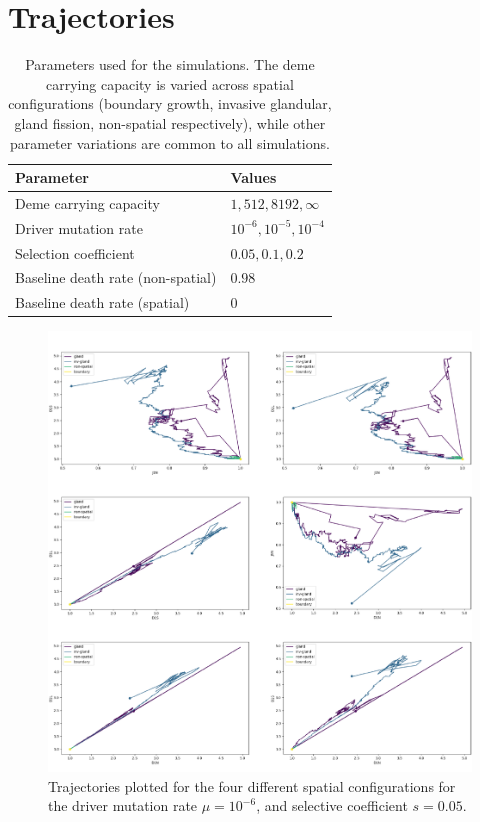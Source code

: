 \chapter{Trajectories}\label{app:trajs}

\begin{table}[h]
\centering
\begin{tabularx}{0.75\textwidth}{|X|X|}
\hline
Parameter & Values \\
\hline
    Deme carrying capacity & $1, 512, 8192, \infty$ \\
    Driver mutation rate & $10^{-6}, 10^{-5}, 10^{-4}$ \\
    Selection coefficient & $0.05, 0.1, 0.2$ \\
    Baseline death rate (non-spatial) & $0.98$ \\
    Baseline death rate (spatial) & $0$ \\
\hline
\end{tabularx}
\caption{Parameters used for the simulations. The deme carrying capacity is
    varied across spatial configurations (boundary growth, invasive glandular,
    gland fission, non-spatial respectively), while other parameter variations
    are common to all simulations.}
\label{tab:traj_params}
\end{table}

\begin{figure}[h]
\centering
\includegraphics[width=\textwidth]{Chapter_3/figures/1e06005new.pdf}
\caption{Trajectories plotted for the four different spatial configurations for
    the driver mutation rate $\mu=10^{-6}$, and selective coefficient
    $s=0.05$.}
\label{fig:1e06005new}
\end{figure}

